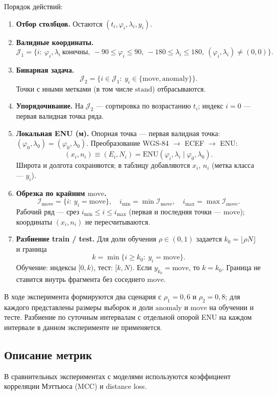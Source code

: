 \documentclass[a4paper,12pt]{report}
\begin{document}
	Порядок действий:
	\begin{enumerate}
		\item \textbf{Отбор столбцов.} Остаются $(t_i,\varphi_i,\lambda_i,y_i)$.
		\item \textbf{Валидные координаты.}
		$$\mathcal{J}_1=\{i:\ \varphi_i,\lambda_i\ \text{конечны},\ -90\le\varphi_i\le 90,\ -180\le\lambda_i\le 180,\ (\varphi_i,\lambda_i)\neq(0,0)\}.$$
		\item \textbf{Бинарная задача.}
		$$\mathcal{J}_2=\{i\in\mathcal{J}_1:\ y_i\in\{\mathrm{move},\mathrm{anomaly}\}\}.$$
		Точки с иными метками (в том числе $\mathrm{stand}$) отбрасываются.
		\item \textbf{Упорядочивание.} На $\mathcal{J}_2$ --- сортировка по возрастанию $t_i$; индекс $i=0$ --- первая валидная точка ряда.
		\item \textbf{Локальная ENU (м).} Опорная точка --- первая валидная точка: $(\varphi_0,\lambda_0)=(\varphi_{0},\lambda_{0})$. Преобразование WGS-84 $\rightarrow$ ECEF $\rightarrow$ ENU:
		$$(x_i,n_i)\equiv(E_i,N_i)=\mathrm{ENU}(\varphi_i,\lambda_i\mid\varphi_0,\lambda_0).$$
		Широта и долгота сохраняются; в таблицу добавляются $x_i$, $n_i$ (метка класса --- $y_i$).
		\item \textbf{Обрезка по крайним $\mathrm{move}$.}
		$$\mathcal{I}_{\mathrm{move}}=\{i:\ y_i=\mathrm{move}\},\quad i_{\min}=\min\mathcal{I}_{\mathrm{move}},\quad i_{\max}=\max\mathcal{I}_{\mathrm{move}}.$$
		Рабочий ряд --- срез $i_{\min}\le i\le i_{\max}$ (первая и последняя точки --- $\mathrm{move}$); координаты $(x_i,n_i)$ не пересчитываются.
		\item \textbf{Разбиение train / test.} Для доли обучения $\rho\in(0,1)$ задается $k_0=\lfloor\rho N\rfloor$ и граница
		$$k=\min\{i\ge k_0:\ y_i=\mathrm{move}\}.$$
		Обучение: индексы $[0,k)$, тест: $[k,N)$. Если $y_{k_0}=\mathrm{move}$, то $k=k_0$. Граница не ставится внутрь фрагмента без соседнего $\mathrm{move}$.
	\end{enumerate}

	В ходе эксперимента формируются два сценария с $\rho_1=0{,}6$ и $\rho_2=0{,}8$; для каждого представлены размеры выборок и доли $\mathrm{anomaly}$ и $\mathrm{move}$ на обучении и тесте. Разбиение по суточным интервалам с отдельной опорой ENU на каждом интервале в данном эксперименте не применяется.

	\subsection{Описание метрик}
	В сравнительных экспериментах с моделями используются коэффициент корреляции Мэттьюса (MCC) и distance loss.
\end{document}
